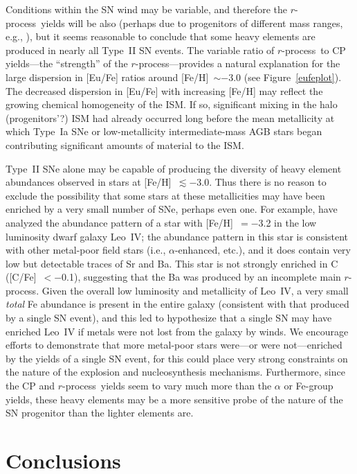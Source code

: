 \documentclass{emulateapj}
\def\rpro{\mbox{$r$-process}}
\begin{document}
Conditions within the SN wind may be variable, and therefore
the \rpro\ yields will be also (perhaps due to progenitors
of different mass ranges, e.g., \citealt{arnone05}), 
but it seems reasonable to conclude
that some heavy elements are produced in nearly 
all Type~II SN events.
The variable ratio of \rpro\ to CP yields---the
``strength'' of the \rpro---provides a natural explanation for
the large dispersion in [Eu/Fe] ratios around [Fe/H]~$\sim -$3.0
(see Figure~\ref{eufeplot}).
The decreased dispersion in [Eu/Fe]
with increasing [Fe/H] may reflect the growing chemical homogeneity
of the ISM.
If so, significant mixing in the halo (progenitors'?)
ISM had already occurred long before the mean metallicity at which
Type~Ia SNe or low-metallicity intermediate-mass AGB stars 
began contributing significant amounts of material to the ISM.

Type~II SNe alone may be capable of 
producing the diversity of heavy element abundances observed in stars
at [Fe/H]~$\lesssim -$3.0.  
Thus there is no reason to exclude the possibility that 
some stars at these metallicities may have been
enriched by a very small number of SNe, perhaps even one.
For example, \citet{simon10} have analyzed the abundance pattern 
of a star with [Fe/H]~$= -$3.2 in the low luminosity 
dwarf galaxy Leo~IV;
the abundance pattern in this star is consistent with other 
metal-poor field stars (i.e., $\alpha$-enhanced, etc.),
and it does contain very low but detectable traces of Sr and Ba.
This star is not strongly enriched in C ([C/Fe]~$< -$0.1), 
suggesting that the Ba was produced by an incomplete main \rpro.
Given the overall low luminosity and metallicity of Leo~IV,
a very small \textit{total} Fe abundance is present in the entire galaxy
(consistent with that produced by a single SN event), and this led
\citet{simon10} to hypothesize that a single SN may have
enriched Leo~IV if metals were not lost from the galaxy by winds.
We encourage efforts to demonstrate that more metal-poor stars were---or were 
not---enriched by the yields of a single SN event, for this
could place very strong constraints on the nature of the
explosion and nucleosynthesis mechanisms.
Furthermore, since the CP and \rpro\ yields seem to vary much more than
the $\alpha$ or Fe-group yields, these heavy elements may be a more sensitive
probe of the nature of the SN progenitor than the lighter elements are.


\section{Conclusions}
\label{conclusions}
\end{document}
